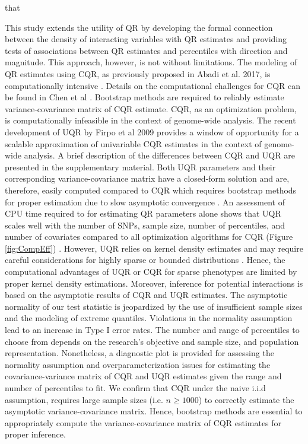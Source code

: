 \documentclass[12pt]{article}
\begin{document}
 that  

This study extends the utility of QR by developing the formal connection between the density of interacting variables with QR estimates and providing tests of associations between QR estimates and percentiles with direction and magnitude. This approach, however, is not without limitations. The modeling of QR estimates using CQR, as previously proposed in Abadi et al. 2017, is computationally intensive \cite{abadi2017penetrance}. Details on the computational challenges for CQR can be found in Chen et al \cite{chen2005computational}. Bootstrap methods are required to reliably estimate variance-covariance matrix of CQR estimate. CQR, as an optimization problem, is computationally infeasible in the context of genome-wide analysis.  The recent development of UQR by Firpo et al 2009 provides a window of opportunity for a scalable approximation of univariable CQR estimates in the context of genome-wide analysis. A brief description of the differences between CQR and UQR are presented in the supplementary material. Both UQR parameters and their corresponding variance-covariance matrix have a closed-form solution and are, therefore, easily computed compared to CQR which requires bootstrap methods for proper estimation due to slow asymptotic convergence \cite{hagemann2017cluster}. An assessment of CPU time required to for estimating QR parameters alone shows that UQR scales well with the number of SNPs, sample size, number of percentiles, and number of covariates compared to all optimization algorithms for CQR (Figure \ref{fig:CompEff}) \cite{knijnenburg2009fewer, koenker1994confidence, koenker1978regression}. However, UQR relies on kernel density estimates and may require careful considerations for highly sparse or bounded distributions \cite{silverman1986density}. Hence, the computational advantages of UQR or CQR for sparse phenotypes are limited by proper kernel density estimations. Moreover, inference for potential interactions is based on the asymptotic results of CQR and UQR estimates. The asymptotic normality of our test statistic is jeopardized by the use of insufficient sample sizes and the modeling of extreme quantiles. Violations in the normality assumption lead to an increase in Type I error rates.  The number and range of percentiles to choose from depends on the research's objective and sample size, and population representation. Nonetheless, a diagnostic plot is provided for assessing the normality assumption and overparameterization issues for estimating the covariance-variance matrix of CQR and UQR estimates given the range and number of percentiles to fit. We confirm that CQR under the naive i.i.d assumption, requires large sample sizes (i.e. $n \geq 1000$) to correctly estimate the asymptotic variance-covariance matrix. Hence, bootstrap methods are essential to appropriately compute the variance-covariance matrix of CQR estimates for proper inference. 
\end{document}
